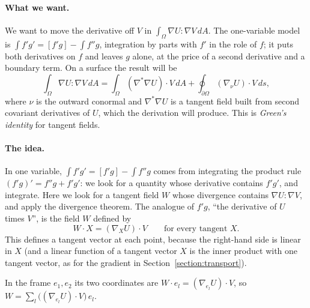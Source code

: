 \paragraph{What we want.} We want to move the derivative off $V$ in $\int_\Omega \nabla U : \nabla V\, dA$. The one-variable model is $\int f' g' = [f' g] - \int f'' g$, integration by parts with $f'$ in the role of $f$; it puts both derivatives on $f$ and leaves $g$ alone, at the price of a second derivative and a boundary term. On a surface the result will be
\begin{equation}
\label{eqn:green}
\int_\Omega \nabla U : \nabla V\, dA = \int_\Omega (\nabla^* \nabla U) \cdot V\, dA + \oint_{\partial \Omega} (\nabla_\nu U) \cdot V\, ds,
\end{equation}
where $\nu$ is the outward conormal and $\nabla^*\nabla U$ is a tangent field built from second covariant derivatives of $U$, which the derivation will produce. This is \emph{Green's identity} for tangent fields.

\paragraph{The idea.} In one variable, $\int f'g' = [f'g] - \int f''g$ comes from integrating the product rule $(f'g)' = f''g + f'g'$: we look for a quantity whose derivative contains $f'g'$, and integrate. Here we look for a tangent field $W$ whose divergence contains $\nabla U : \nabla V$, and apply the divergence theorem. The analogue of $f'g$, ``the derivative of $U$ times $V$'', is the field $W$ defined by
\begin{equation*}
W \cdot X = (\nabla_X U) \cdot V \qquad \text{for every tangent } X .
\end{equation*}
This defines a tangent vector at each point, because the right-hand side is linear in $X$ (and a linear function of a tangent vector $X$ is the inner product with one tangent vector, as for the gradient in Section~\ref{section:transport}).

In the frame $e_1, e_2$ its two coordinates are $W\cdot e_l = (\nabla_{e_l} U)\cdot V$, so $W = \sum_l \big((\nabla_{e_l} U)\cdot V\big)\, e_l$.

